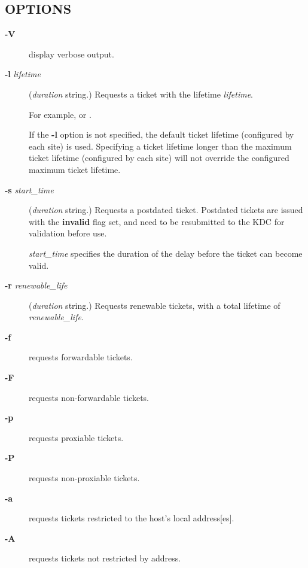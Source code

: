\documentclass[letterpaper,10pt,english]{sphinxmanual}
\begin{document}
\subsection{OPTIONS}
\label{user/user_commands/kinit:options}\begin{description}
\item[{\textbf{-V}}] \leavevmode
display verbose output.

\item[{\textbf{-l} \emph{lifetime}}] \leavevmode
(\emph{duration} string.)  Requests a ticket with the lifetime
\emph{lifetime}.

For example,  or .

If the \textbf{-l} option is not specified, the default ticket lifetime
(configured by each site) is used.  Specifying a ticket lifetime
longer than the maximum ticket lifetime (configured by each site)
will not override the configured maximum ticket lifetime.

\item[{\textbf{-s} \emph{start\_time}}] \leavevmode
(\emph{duration} string.)  Requests a postdated ticket.  Postdated
tickets are issued with the \textbf{invalid} flag set, and need to be
resubmitted to the KDC for validation before use.

\emph{start\_time} specifies the duration of the delay before the ticket
can become valid.

\item[{\textbf{-r} \emph{renewable\_life}}] \leavevmode
(\emph{duration} string.)  Requests renewable tickets, with a total
lifetime of \emph{renewable\_life}.

\item[{\textbf{-f}}] \leavevmode
requests forwardable tickets.

\item[{\textbf{-F}}] \leavevmode
requests non-forwardable tickets.

\item[{\textbf{-p}}] \leavevmode
requests proxiable tickets.

\item[{\textbf{-P}}] \leavevmode
requests non-proxiable tickets.

\item[{\textbf{-a}}] \leavevmode
requests tickets restricted to the host's local address{[}es{]}.

\item[{\textbf{-A}}] \leavevmode
requests tickets not restricted by address.


\end{description}
\end{document}
